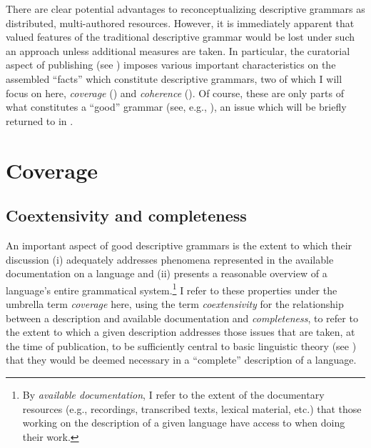 There are clear potential advantages to reconceptualizing descriptive grammars
as distributed, multi-authored resources. However, it is immediately apparent
that valued features of the traditional descriptive grammar would be lost under
such an approach unless additional measures are taken. In particular, the
curatorial aspect of publishing (see ) imposes various important
characteristics on the assembled ``facts'' which constitute descriptive
grammars, two of which I will focus on here, \emph{coverage} ()
and \emph{coherence} (). Of course, these are only parts of what
constitutes a ``good'' grammar (see, e.g.,
), an issue which will be briefly
returned to in .




\section{Coverage \label{Coverage}}

\subsection{Coextensivity and completeness\label{TwoCoverages}}

An important aspect of good descriptive grammars is the extent to which their
discussion (i) adequately addresses phenomena represented in the available
documentation on a language and (ii) presents a reasonable overview of a
language's entire grammatical system.{\footnote{By \emph{available
documentation}, I refer to the extent of the documentary resources (e.g.,
recordings, transcribed texts, lexical material, etc.) that those working on the
description of a given language have access to when doing their work.}} I refer
to these properties under the umbrella term \emph{coverage} here, using the term
\emph{coextensivity} for the relationship between a description and available
documentation and \emph{completeness}, to refer to the extent to which a given
description addresses those issues that are taken, at the time of publication,
to be sufficiently central to basic linguistic theory (see
) that they would be deemed necessary in a ``complete''
description of a language.

